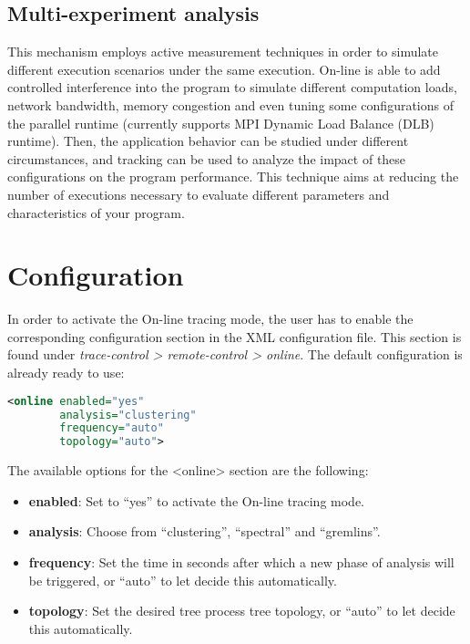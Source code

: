 \subsection{Multi-experiment analysis}

This mechanism employs active measurement techniques in order to simulate different execution scenarios 
under the same execution. \TRACE On-line is able to add controlled 
interference into the program to simulate different computation loads, network bandwidth, memory congestion
and even tuning some configurations of the parallel runtime (currently supports MPI Dynamic Load Balance (DLB)
runtime). Then, the application behavior can be studied under different circumstances, and tracking can be 
used to analyze the impact of these configurations on the program performance.
This technique aims at reducing the number of executions necessary to evaluate different parameters and 
characteristics of your program.


\section{Configuration}
\label{sec:Configuration}

  In order to activate the On-line tracing mode, the user has to enable the corresponding configuration section 
  in the \TRACE XML configuration file. This section is 
  found under \emph{trace-control > remote-control > online}. The default configuration is already 
  ready to use:  

\begin{lstlisting}[language=XML,frame=single]
<online enabled="yes" 
        analysis="clustering" 
        frequency="auto" 
        topology="auto">
\end{lstlisting}

  The available options for the <online> section are the following:
  
\begin{itemize}
 \item \textbf{enabled}: Set to ``yes'' to activate the On-line tracing mode.
 \item \textbf{analysis}: Choose from ``clustering'', ``spectral'' and ``gremlins''.
 \item \textbf{frequency}: Set the time in seconds after which a new phase of analysis will be triggered, or ``auto'' to let \TRACE decide this automatically.
 \item \textbf{topology}: Set the desired tree process tree topology, or ``auto'' to let \TRACE decide this automatically.
\end{itemize}

